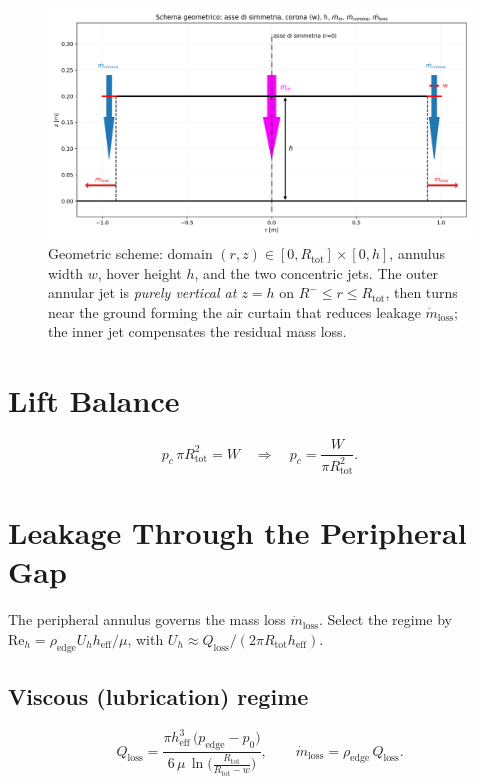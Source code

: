 \documentclass[11pt,a4paper]{article}
\begin{document}
\begin{figure}[t]
  \centering
  \includegraphics[width=0.95\linewidth]{./figures/schema_geometry.png}
  \caption{Geometric scheme: domain $(r,z)\in[0,R_{\text{tot}}]\times[0,h]$, annulus width $w$, hover height $h$, and the two concentric jets. The outer annular jet is \emph{purely vertical at $z=h$} on $R^-\!\le r\!\le R_{\text{tot}}$, then turns near the ground forming the air curtain that reduces leakage $\dot m_{\mathrm{loss}}$; the inner jet compensates the residual mass loss.}
  \label{fig:geometry}
\end{figure}

\section{Lift Balance}
\begin{equation}
  p_c\,\pi R_{\text{tot}}^2 = W
  \quad \Rightarrow \quad
  p_c = \frac{W}{\pi R_{\text{tot}}^2}.
  \label{eq:lift}
\end{equation}

\section{Leakage Through the Peripheral Gap}
The peripheral annulus governs the mass loss $\dot m_{\mathrm{loss}}$. Select the regime by $\mathrm{Re}_h=\rho_\mathrm{edge} U_h h_{\mathrm{eff}}/\mu$, with $U_h\approx Q_{\mathrm{loss}}/(2\pi R_{\text{tot}} h_{\mathrm{eff}})$.
\subsection*{Viscous (lubrication) regime}
\begin{equation}
  Q_{\mathrm{loss}}
  = \frac{\pi h_{\mathrm{eff}}^{3}\,\big(p_\mathrm{edge}-p_0\big)}{6\,\mu\,\ln\!\big(\tfrac{R_{\text{tot}}}{R_{\text{tot}}-w}\big)},
  \qquad \dot m_{\mathrm{loss}}=\rho_\mathrm{edge}\,Q_{\mathrm{loss}}.
  \label{eq:qloss_lub}
\end{equation}
\end{document}
